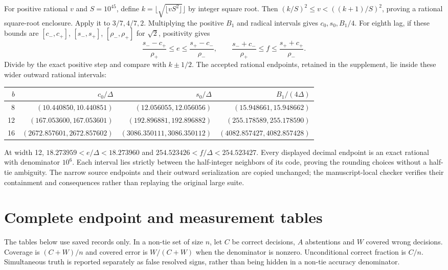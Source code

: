 For positive rational $v$ and $S=10^{45}$, define
$k=\lfloor\sqrt{\lfloor vS^2\rfloor}\rfloor$ by integer square root. Then
$(k/S)^2\le v<((k+1)/S)^2$, proving a rational square-root enclosure. Apply it to $3/7,4/7,2$. Multiplying the positive $B_1$ and radical intervals gives $c_0,s_0,B_1/4$. For eighth lag, if these bounds are $[c_-,c_+]$, $[s_-,s_+]$, $[\rho_-,\rho_+]$ for $\sqrt2$, positivity gives
\[
 \frac{s_--c_+}{\rho_+}\le e\le\frac{s_+-c_-}{\rho_-},
 \qquad
 \frac{s_-+c_-}{\rho_+}\le f\le\frac{s_++c_+}{\rho_-}.
\]
Divide by the exact positive step and compare with $k\pm1/2$. The accepted rational endpoints, retained in the supplement, lie inside these wider outward rational intervals:
\begin{center}
\begin{tabular}{rrrr}\toprule
$b$ & $c_0/\Delta$ & $s_0/\Delta$ & $B_1/(4\Delta)$\\\midrule
8 & $(10.440850,10.440851)$ & $(12.056055,12.056056)$ & $(15.948661,15.948662)$\\
12 & $(167.053600,167.053601)$ & $(192.896881,192.896882)$ & $(255.178589,255.178590)$\\
16 & $(2672.857601,2672.857602)$ & $(3086.350111,3086.350112)$ & $(4082.857427,4082.857428)$\\\bottomrule
\end{tabular}
\end{center}
At width 12, $18.273959<e/\Delta<18.273960$ and
$254.523426<f/\Delta<254.523427$. Every displayed decimal endpoint is an exact rational with denominator $10^6$. Each interval lies strictly between the half-integer neighbors of its code, proving the rounding choices without a half-tie ambiguity. The narrow source endpoints and their outward serialization are copied unchanged; the manuscript-local checker verifies their containment and consequences rather than replaying the original large suite.

\section{Complete endpoint and measurement tables}\label{app:data}
The tables below use saved records only. In a non-tie set of size $n$, let $C$ be correct decisions, $A$ abstentions and $W$ covered wrong decisions. Coverage is $(C+W)/n$ and covered error is $W/(C+W)$ when the denominator is nonzero. Unconditional correct fraction is $C/n$. Simultaneous truth is reported separately as false resolved signs, rather than being hidden in a non-tie accuracy denominator.


